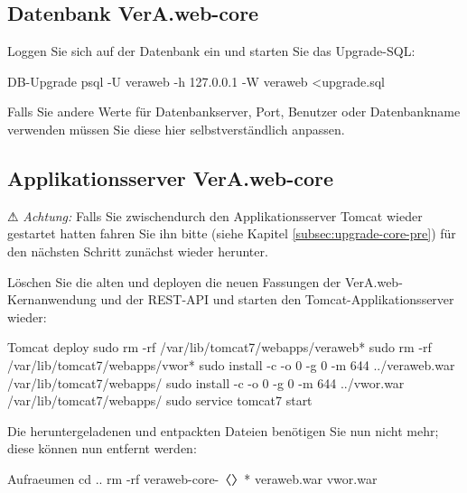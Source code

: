 \fi\fi%

\subsection{Datenbank VerA.web-core}\label{subsec:upgrade-core-db}

\begin{minipage}{\textwidth}
Loggen Sie sich auf der Datenbank ein und starten Sie das Upgrade-SQL:

\begin{lstdump}{DB-Upgrade}
psql -U veraweb -h 127.0.0.1 -W veraweb <upgrade.sql
\end{lstdump}

Falls Sie andere Werte für Datenbankserver, Port, Benutzer oder Datenbankname
verwenden müssen Sie diese hier selbstverständlich anpassen.
\end{minipage}

\subsection{Applikationsserver VerA.web-core}\label{subsec:upgrade-core-tomcat}

⚠ \emph{Achtung:} Falls Sie zwischendurch den Applikationsserver
Tomcat wieder gestartet hatten fahren Sie ihn bitte (siehe Kapitel
\ref{subsec:upgrade-core-pre}) für den nächsten Schritt zunächst
wieder herunter.

\begin{minipage}{\textwidth}
Löschen Sie die alten und deployen die neuen Fassungen der
VerA.web-Kernanwendung und der REST-API und starten den
Tomcat-Applikationsserver wieder:

\begin{lstdump}{Tomcat deploy}
sudo rm -rf /var/lib/tomcat7/webapps/veraweb*
sudo rm -rf /var/lib/tomcat7/webapps/vwor*
sudo install -c -o 0 -g 0 -m 644 ../veraweb.war /var/lib/tomcat7/webapps/
sudo install -c -o 0 -g 0 -m 644 ../vwor.war /var/lib/tomcat7/webapps/
sudo service tomcat7 start
\end{lstdump}
\end{minipage}

\begin{minipage}{\textwidth}
Die heruntergeladenen und entpackten Dateien benötigen Sie nun nicht
mehr; diese können nun entfernt werden:

\begin{lstdump}{Aufraeumen}
cd ..
rm -rf veraweb-core-〈\lstdumpesc{\vwiaverssw}〉* veraweb.war vwor.war
\end{lstdump}
\end{minipage}


